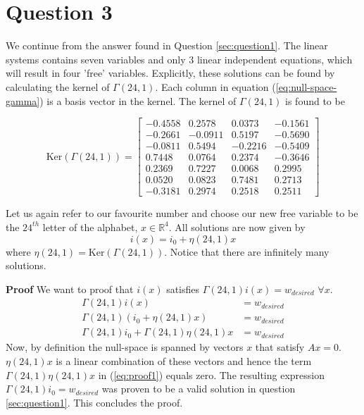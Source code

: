 \documentclass[a4paper,10pt]{article}
\begin{document}
\section{Question 3} \label{sec:question3}
We continue from the answer found in Question \ref{sec:question1}. The linear systems contains seven variables and only 3 linear independent equations, which will result in four 'free' variables. Explicitly, these solutions can be found by calculating the kernel of $\Gamma(24,1)$. Each column in equation (\ref{eq:null-space-gamma}) is a basis vector in the kernel. The kernel of $\Gamma(24,1)$ is found to be

\begin{equation} \label{eq:null-space-gamma}
\text{Ker}(\Gamma(24,1))=
\begin{bmatrix}
   -0.4558 &   0.2578 &   0.0373 &  -0.1561\\
   -0.2661 &  -0.0911 &   0.5197 &  -0.5690\\
   -0.0811 &   0.5494 &  -0.2216 &  -0.5409\\
    0.7448 &   0.0764 &   0.2374 &  -0.3646\\
    0.2369 &   0.7227 &   0.0068 &   0.2995\\
    0.0520 &   0.0823 &   0.7481 &   0.2713\\
   -0.3181 &   0.2974 &   0.2518 &   0.2511
\end{bmatrix}
\end{equation}

Let us again refer to our favourite number and choose our new free variable to be the $24^{th}$ letter of the alphabet, $x\in \mathbb{R}^4$. All solutions are now given by
\begin{equation} \label{eq:allsolutions}
    i(x) = i_0 + \eta(24,1)x
\end{equation}
where $\eta(24,1) = \text{Ker}(\Gamma(24,1))$. Notice that there are infinitely many solutions. 

\noindent \textbf{Proof}
We want to proof that $i(x)$ satisfies $\Gamma(24,1)i(x) = w_{desired}$ \hspace{1ex} $\forall x$. 
\begin{align}
    \Gamma(24,1)i(x) &= w_{desired} \\
    \Gamma(24,1)(i_0 + \eta(24,1)x) &= w_{desired} \\
    \Gamma(24,1)i_0 + \Gamma(24,1)\eta(24,1)x &= w_{desired} \label{eq:proof1}
\end{align}
Now, by definition the null-space is spanned by vectors $x$ that satisfy $Ax=0$. $\eta(24,1)x$ is a linear combination of these vectors and hence the term $\Gamma(24,1)\eta(24,1)x$ in (\ref{eq:proof1}) equals zero. The resulting expression $\Gamma(24,1)i_0= w_{desired}$ was proven to be a valid solution in question \ref{sec:question1}. This concludes the proof.
\end{document}
